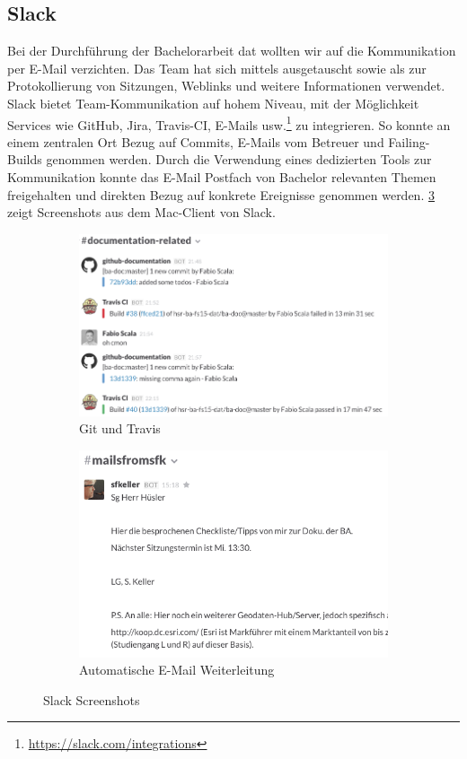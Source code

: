 \subsection{Slack}
Bei der Durchführung der Bachelorarbeit \gls{dat} wollten wir auf die Kommunikation per E-Mail verzichten. Das Team hat sich mittels  ausgetauscht sowie als zur Protokollierung von Sitzungen, Weblinks und weitere Informationen verwendet. Slack bietet Team-Kommunikation auf hohem Niveau, mit der Möglichkeit Services wie GitHub, Jira, Travis-CI, E-Mails usw.\footnote{\url{https://slack.com/integrations}} zu integrieren. So konnte an einem zentralen Ort Bezug auf Commits, E-Mails vom Betreuer und Failing-Builds genommen werden. Durch die Verwendung eines dedizierten Tools zur Kommunikation konnte das E-Mail Postfach von Bachelor relevanten Themen freigehalten und direkten Bezug auf konkrete Ereignisse genommen werden. \cref{fig:pm:slack} zeigt Screenshots aus dem Mac-Client von Slack.

\begin{figure}[H]
	\centering
	\begin{subfigure}{0.49\textwidth}
		\centering
		\includegraphics[width=\linewidth]{fig/slack-git-travis}
		\caption{Git und Travis}
		\label{fig:pm:slack-git-travis}
	\end{subfigure}
	\begin{subfigure}{0.49\textwidth}
		\centering
		\includegraphics[width=\linewidth]{fig/slack-email}
		\caption{Automatische E-Mail Weiterleitung}
		\label{fig:pm:slack-email}
	\end{subfigure}
	\caption{Slack Screenshots}
	\label{fig:pm:slack}
\end{figure}

